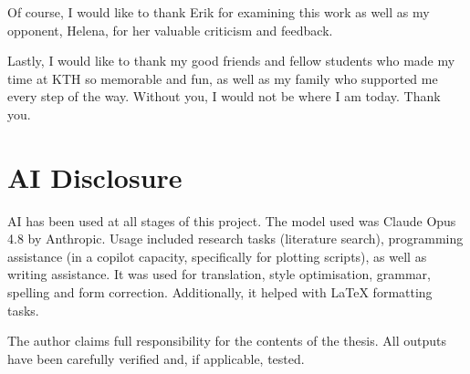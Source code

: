 \documentclass[final, english, biblatex]{kththesis}
\newcommand*{\engExpl}[1]{\todo[inline, backgroundcolor=kth-lightgreen40]{#1}} %
\newcommand*{\iwarning}[1]{\todo[inline, backgroundcolor=yellow!40]{#1}}
\begin{document}
Of course, I would like to thank Erik for examining this work as well as my opponent, Helena, for her valuable criticism and feedback.

Lastly, I would like to thank my good friends and fellow students who made my time at KTH so memorable and fun, as well as my family who supported me every step of the way.
Without you, I would not be where I am today. Thank you.

\acknowlegmentssignature

\cleardoublepage
\section*{AI Disclosure}
AI has been used at all stages of this project.
The model used was Claude Opus 4.8 by Anthropic.
Usage included research tasks (literature search), programming assistance (in a copilot capacity, specifically for plotting scripts),
as well as writing assistance.
It was used for translation, style optimisation, grammar, spelling and form correction.
Additionally, it helped with LaTeX formatting tasks.

The author claims full responsibility for the contents of the thesis.
All outputs have been carefully verified and, if applicable, tested.

\cleardoublepage
{}
\renewcommand{\chaptermark}[1]{ \markboth{#1}{}} 
\tableofcontents
  \markboth{\contentsname}{}

\cleardoublepage
\listoffigures

\cleardoublepage

\listoftables
\cleardoublepage


\printglossary[style=mylong, type=\acronymtype, title={List of acronyms and abbreviations}]
\end{document}
